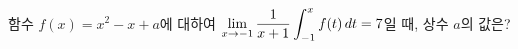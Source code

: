 함수 $f(x)=x^2-x+a$에 대하여 $\displaystyle\lim_{x\to -1}\dfrac{1}{x+1}\int_{-1}^{x} f(t)\mkern3mu dt=7$일 때, 상수 $a$의 값은?
